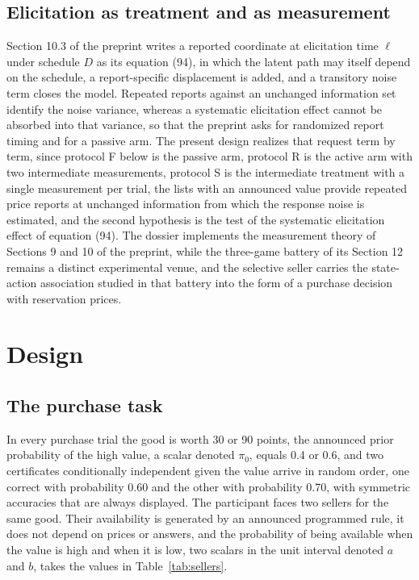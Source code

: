 \documentclass[11pt,a4paper]{article}
\begin{document}
\subsection{Elicitation as treatment and as measurement}

Section 10.3 of the preprint writes a reported coordinate at elicitation time $\ell$ under schedule $D$ as its equation (94), in which the latent path may itself depend on the schedule, a report-specific displacement is added, and a transitory noise term closes the model. Repeated reports against an unchanged information set identify the noise variance, whereas a systematic elicitation effect cannot be absorbed into that variance, so that the preprint asks for randomized report timing and for a passive arm. The present design realizes that request term by term, since protocol F below is the passive arm, protocol R is the active arm with two intermediate measurements, protocol S is the intermediate treatment with a single measurement per trial, the lists with an announced value provide repeated price reports at unchanged information from which the response noise is estimated, and the second hypothesis is the test of the systematic elicitation effect of equation (94). The dossier implements the measurement theory of Sections 9 and 10 of the preprint, while the three-game battery of its Section 12 remains a distinct experimental venue, and the selective seller carries the state-action association studied in that battery into the form of a purchase decision with reservation prices.

\section{Design}

\subsection{The purchase task}

In every purchase trial the good is worth 30 or 90 points, the announced prior probability of the high value, a scalar denoted $\pi_{0}$, equals 0.4 or 0.6, and two certificates conditionally independent given the value arrive in random order, one correct with probability 0.60 and the other with probability 0.70, with symmetric accuracies that are always displayed. The participant faces two sellers for the same good. Their availability is generated by an announced programmed rule, it does not depend on prices or answers, and the probability of being available when the value is high and when it is low, two scalars in the unit interval denoted $a$ and $b$, takes the values in Table~\ref{tab:sellers}.
\end{document}
